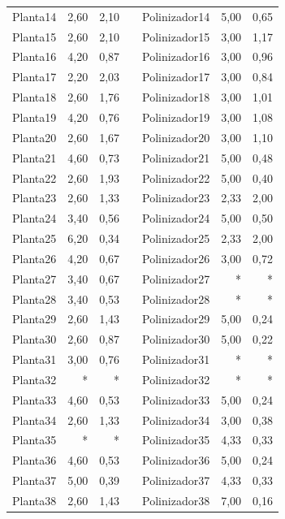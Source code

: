 \begin{table}[htbp]
\begin{tabular}{lrrrlrr}
    Planta14 & 2,60 & 2,10 &      & Polinizador14 & 5,00 & 0,65 \\
    Planta15 & 2,60 & 2,10 &      & Polinizador15 & 3,00 & 1,17 \\
    Planta16 & 4,20 & 0,87 &      & Polinizador16 & 3,00 & 0,96 \\
    Planta17 & 2,20 & 2,03 &      & Polinizador17 & 3,00 & 0,84 \\
    Planta18 & 2,60 & 1,76 &      & Polinizador18 & 3,00 & 1,01 \\
    Planta19 & 4,20 & 0,76 &      & Polinizador19 & 3,00 & 1,08 \\
    Planta20 & 2,60 & 1,67 &      & Polinizador20 & 3,00 & 1,10 \\
    Planta21 & 4,60 & 0,73 &      & Polinizador21 & 5,00 & 0,48 \\
    Planta22 & 2,60 & 1,93 &      & Polinizador22 & 5,00 & 0,40 \\
    Planta23 & 2,60 & 1,33 &      & Polinizador23 & 2,33 & 2,00 \\
    Planta24 & 3,40 & 0,56 &      & Polinizador24 & 5,00 & 0,50 \\
    Planta25 & 6,20 & 0,34 &      & Polinizador25 & 2,33 & 2,00 \\
    Planta26 & 4,20 & 0,67 &      & Polinizador26 & 3,00 & 0,72 \\
    Planta27 & 3,40 & 0,67 &      & Polinizador27 & *    & * \\
    Planta28 & 3,40 & 0,53 &      & Polinizador28 & *    & * \\
    Planta29 & 2,60 & 1,43 &      & Polinizador29 & 5,00 & 0,24 \\
    Planta30 & 2,60 & 0,87 &      & Polinizador30 & 5,00 & 0,22 \\
    Planta31 & 3,00 & 0,76 &      & Polinizador31 & *    & * \\
    Planta32 & *    & *    &      & Polinizador32 & *    & * \\
    Planta33 & 4,60 & 0,53 &      & Polinizador33 & 5,00 & 0,24 \\
    Planta34 & 2,60 & 1,33 &      & Polinizador34 & 3,00 & 0,38 \\
    Planta35 & *    & *    &      & Polinizador35 & 4,33 & 0,33 \\
    Planta36 & 4,60 & 0,53 &      & Polinizador36 & 5,00 & 0,24 \\
    Planta37 & 5,00 & 0,39 &      & Polinizador37 & 4,33 & 0,33 \\
    Planta38 & 2,60 & 1,43 &      & Polinizador38 & 7,00 & 0,16 \\

\end{tabular}
\end{table}
